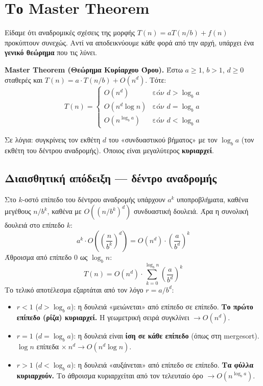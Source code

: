 \documentclass[11pt,a4paper]{article}
\begin{document}
\section{Το Master Theorem}

Είδαμε ότι αναδρομικές σχέσεις της μορφής $T(n) = a T(n/b) + f(n)$ προκύπτουν
συνεχώς. Αντί να αποδεικνύουμε κάθε φορά από την αρχή, υπάρχει ένα \textbf{γενικό
θεώρημα} που τις λύνει.

\begin{keypoint}
\textbf{Master Theorem (Θεώρημα Κυρίαρχου Όρου).} Έστω $a \ge 1$, $b > 1$,
$d \ge 0$ σταθερές και $T(n) = a \cdot T(n/b) + O(n^d)$. Τότε:
\[
T(n) = \begin{cases}
O(n^d)          & \text{εάν } d > \log_b a \\
O(n^d \log n)   & \text{εάν } d = \log_b a \\
O(n^{\log_b a}) & \text{εάν } d < \log_b a
\end{cases}
\]
\end{keypoint}

Σε λόγια: συγκρίνεις τον εκθέτη $d$ του «συνδυαστικού βήματος» με τον $\log_b a$
(τον εκθέτη του δέντρου αναδρομής). Όποιος είναι μεγαλύτερος \textbf{κυριαρχεί}.

\subsection{Διαισθητική απόδειξη --- δέντρο αναδρομής}

Στο $k$-οστό επίπεδο του δέντρου αναδρομής υπάρχουν $a^k$ υποπροβλήματα, καθένα
μεγέθους $n/b^k$, καθένα με $O((n/b^k)^d)$ συνδυαστική δουλειά. Άρα η συνολική
δουλειά στο επίπεδο $k$:
\[
a^k \cdot O\!\left(\left(\frac{n}{b^k}\right)^d\right) = O(n^d) \cdot
\left(\frac{a}{b^d}\right)^k
\]
Άθροισμα από επίπεδο 0 ως $\log_b n$:
\[
T(n) = O(n^d) \cdot \sum_{k=0}^{\log_b n} \left(\frac{a}{b^d}\right)^k
\]
Το τελικό αποτέλεσμα εξαρτάται από τον λόγο $r = a / b^d$:
\begin{itemize}
  \item $r < 1$ ($d > \log_b a$): η δουλειά «μειώνεται» από επίπεδο σε επίπεδο.
  \textbf{Το πρώτο επίπεδο (ρίζα) κυριαρχεί.} Η γεωμετρική σειρά συγκλίνει $\to
  O(n^d)$.
  \item $r = 1$ ($d = \log_b a$): η δουλειά είναι \textbf{ίση σε κάθε επίπεδο}
  (όπως στη mergesort). $\log n$ επίπεδα $\times\ n^d \to O(n^d \log n)$.
  \item $r > 1$ ($d < \log_b a$): η δουλειά «αυξάνεται» από επίπεδο σε επίπεδο.
  \textbf{Τα φύλλα κυριαρχούν.} Το άθροισμα κυριαρχείται από τον τελευταίο όρο
  $\to O(n^{\log_b a})$.
\end{itemize}
\end{document}
